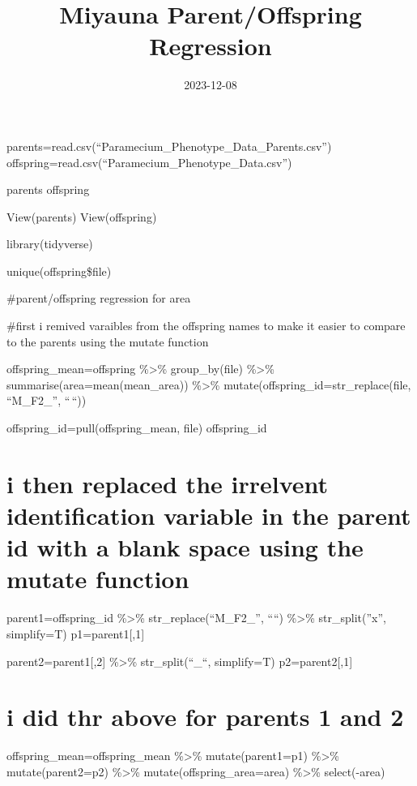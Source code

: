 \documentclass[
]{article}
\title{Miyauna Parent/Offspring Regression}
\author{}
\date{\vspace{-2.5em}2023-12-08}
\begin{document}
\maketitle

parents=read.csv(``Paramecium\_Phenotype\_Data\_Parents.csv'')
offspring=read.csv(``Paramecium\_Phenotype\_Data.csv'')

parents offspring

View(parents) View(offspring)

library(tidyverse)

unique(offspring\$file)

\#parent/offspring regression for area

\#first i remived varaibles from the offspring names to make it easier
to compare to the parents using the mutate function

offspring\_mean=offspring \%\textgreater\% group\_by(file)
\%\textgreater\% summarise(area=mean(mean\_area)) \%\textgreater\%
mutate(offspring\_id=str\_replace(file, ``M\_F2\_'', ``\,``))

offspring\_id=pull(offspring\_mean, file) offspring\_id

\hypertarget{i-then-replaced-the-irrelvent-identification-variable-in-the-parent-id-with-a-blank-space-using-the-mutate-function}{%
\section{i then replaced the irrelvent identification variable in the
parent id with a blank space using the mutate
function}\label{i-then-replaced-the-irrelvent-identification-variable-in-the-parent-id-with-a-blank-space-using-the-mutate-function}}

parent1=offspring\_id \%\textgreater\% str\_replace(``M\_F2\_'', ````)
\%\textgreater\% str\_split(''x'', simplify=T) p1=parent1{[},1{]}

parent2=parent1{[},2{]} \%\textgreater\% str\_split(``\_``, simplify=T)
p2=parent2{[},1{]}

\hypertarget{i-did-thr-above-for-parents-1-and-2}{%
\section{i did thr above for parents 1 and
2}\label{i-did-thr-above-for-parents-1-and-2}}

offspring\_mean=offspring\_mean \%\textgreater\% mutate(parent1=p1)
\%\textgreater\% mutate(parent2=p2) \%\textgreater\%
mutate(offspring\_area=area) \%\textgreater\% select(-area)
\end{document}
